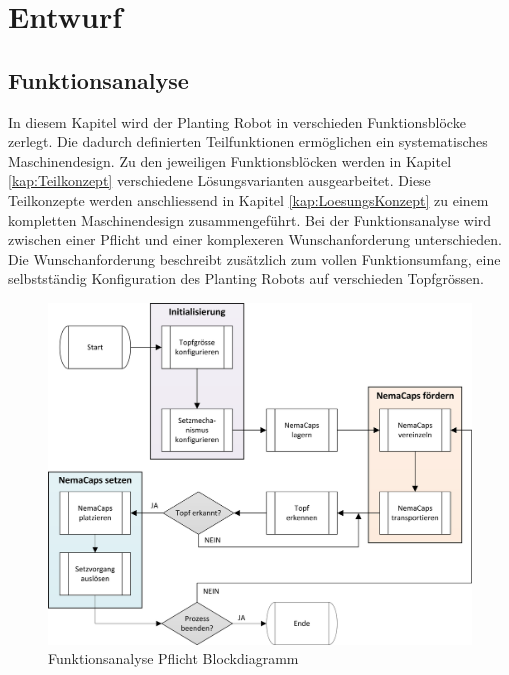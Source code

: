 \newpage
\section{Entwurf}
\subsection{Funktionsanalyse}

In diesem Kapitel wird der Planting Robot in verschieden Funktionsblöcke zerlegt. Die dadurch definierten Teilfunktionen ermöglichen ein systematisches Maschinendesign. Zu den jeweiligen Funktionsblöcken werden in Kapitel \ref{kap:Teilkonzept} verschiedene Lösungsvarianten ausgearbeitet. Diese Teilkonzepte werden anschliessend in Kapitel \ref{kap:LoesungsKonzept} zu einem kompletten Maschinendesign zusammengeführt.\newline
Bei der Funktionsanalyse wird zwischen einer Pflicht und einer komplexeren Wunschanforderung unterschieden. Die Wunschanforderung beschreibt zusätzlich zum vollen Funktionsumfang, eine selbstständig Konfiguration des Planting Robots auf verschieden Topfgrössen.


\begin{figure}[H]
	\includegraphics[width=1\textwidth]{Illustrationen/2-Funktionsanalyse/Funktionsanalyse_Pflicht.png}
	\caption{Funktionsanalyse Pflicht Blockdiagramm}
	\label{fig:FunktPflicht}
\end{figure}

